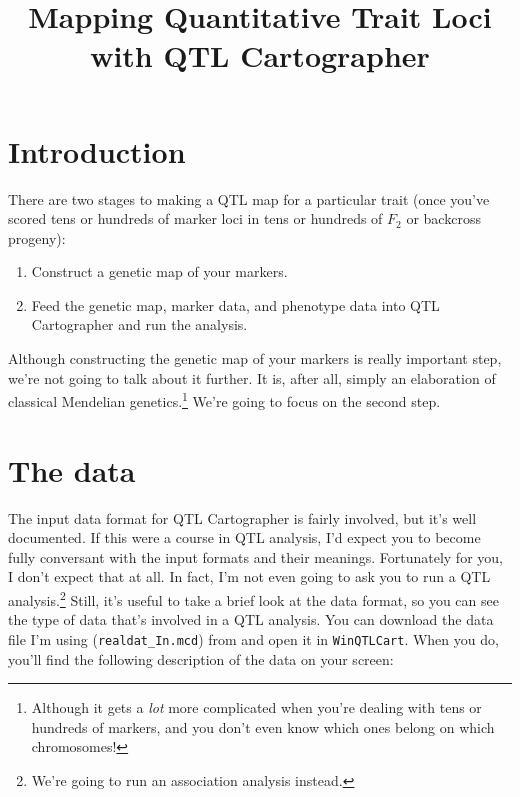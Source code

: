 \documentclass[12pt]{article}
\title{Mapping Quantitative Trait Loci with QTL Cartographer}
\begin{document}
\maketitle

\thispagestyle{first}

\section*{Introduction}

There are two stages to making a QTL map for a particular trait
(once you've scored tens or hundreds of marker loci in tens or
hundreds of $F_2$ or backcross progeny):

\begin{enumerate}

\item Construct a genetic map of your markers.

\item Feed the genetic map, marker data, and phenotype data into QTL
Cartographer and run the analysis.

\end{enumerate}

\noindent Although constructing the genetic map of your markers is
really important step, we're not going to talk about it further. It
is, after all, simply an elaboration of classical Mendelian
genetics.\footnote{Although it gets a {\it lot\/} more complicated
  when you're dealing with tens or hundreds of markers, and you don't
  even know which ones belong on which chromosomes!} We're going to
focus on the second step.

\section*{The data}

The input data format for QTL Cartographer is fairly involved, but
it's well documented. If this were a course in QTL analysis, I'd
expect you to become fully conversant with the input formats and their
meanings. Fortunately for you, I don't expect that at all. In fact,
I'm not even going to ask you to run a QTL analysis.\footnote{We're
  going to run an association analysis instead.} Still, it's useful to
take a brief look at the data format, so you can see the type of data
that's involved in a QTL analysis. You can download the data file I'm
using ({\tt realdat\_In.mcd}) from
and open it in {\tt WinQTLCart}. When you do, you'll find the
following description of the data on your screen:
\end{document}

